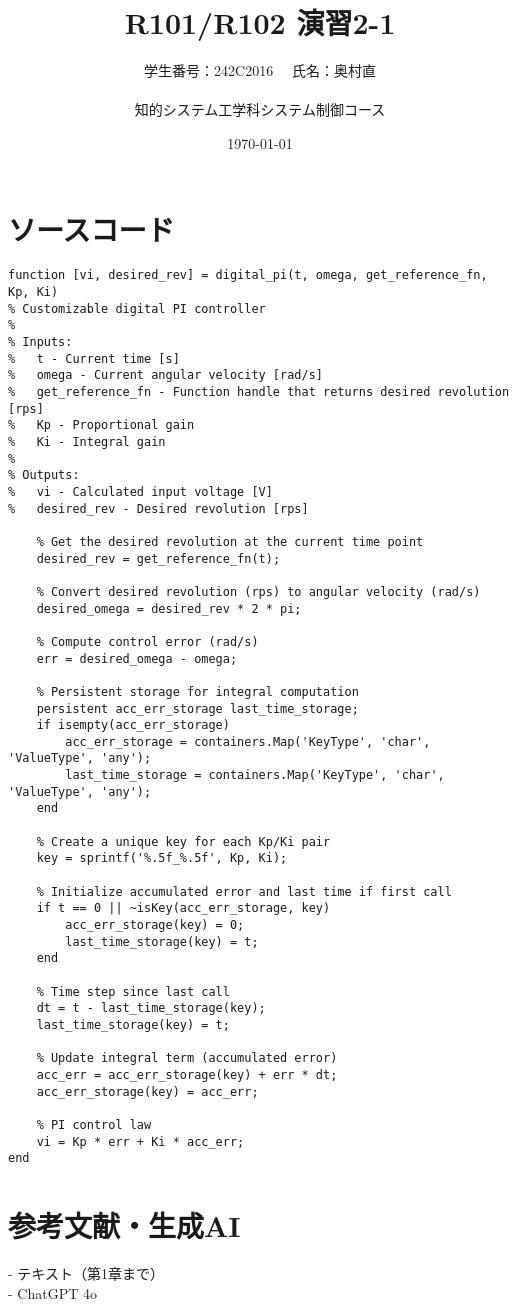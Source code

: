 \documentclass[10pt,a4paper,titlepage]{jreport} %
\title{R101/R102 演習2-1} %
\author{
  学生番号：242C2016 　氏名：奥村直 \\
  \\
  知的システム工学科システム制御コース
  } %
\date{\today} %
\begin{document}
\maketitle

\chapter{ソースコード}
\begin{lstlisting}[caption= digital＿pi.m]
function [vi, desired_rev] = digital_pi(t, omega, get_reference_fn, Kp, Ki)
% Customizable digital PI controller
%
% Inputs:
%   t - Current time [s]
%   omega - Current angular velocity [rad/s]
%   get_reference_fn - Function handle that returns desired revolution [rps]
%   Kp - Proportional gain
%   Ki - Integral gain
%
% Outputs:
%   vi - Calculated input voltage [V]
%   desired_rev - Desired revolution [rps]

    % Get the desired revolution at the current time point
    desired_rev = get_reference_fn(t);

    % Convert desired revolution (rps) to angular velocity (rad/s)
    desired_omega = desired_rev * 2 * pi;

    % Compute control error (rad/s)
    err = desired_omega - omega;

    % Persistent storage for integral computation
    persistent acc_err_storage last_time_storage;
    if isempty(acc_err_storage)
        acc_err_storage = containers.Map('KeyType', 'char', 'ValueType', 'any');
        last_time_storage = containers.Map('KeyType', 'char', 'ValueType', 'any');
    end

    % Create a unique key for each Kp/Ki pair
    key = sprintf('%.5f_%.5f', Kp, Ki);

    % Initialize accumulated error and last time if first call
    if t == 0 || ~isKey(acc_err_storage, key)
        acc_err_storage(key) = 0;
        last_time_storage(key) = t;
    end

    % Time step since last call
    dt = t - last_time_storage(key);
    last_time_storage(key) = t;

    % Update integral term (accumulated error)
    acc_err = acc_err_storage(key) + err * dt;
    acc_err_storage(key) = acc_err;

    % PI control law
    vi = Kp * err + Ki * acc_err;
end

\end{lstlisting}

\chapter{参考文献・生成AI}
- テキスト（第1章まで）\\
- ChatGPT 4o
\end{document}
